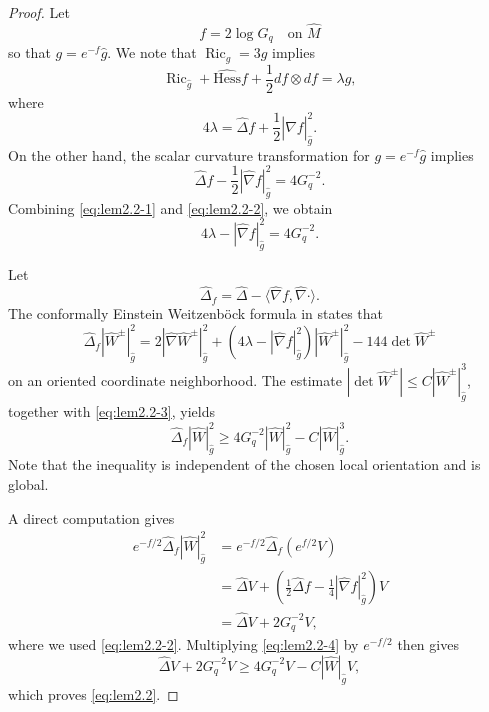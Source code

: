 \documentclass[11pt]{amsart}
\theoremstyle{plain}
\numberwithin{equation}{section}
\newcommand{\wh}[1]{\widehat{#1}}
\newcommand{\hess}{\mathrm{Hess}}
\DeclareMathOperator{\ric}{Ric}
\newcommand{\hd}{\widehat{\Delta}}
\newcommand{\hn}{\widehat{\nabla}}
\newcommand{\hg}{\widehat{g}}
\newcommand{\hw}{\widehat{W}}
\newcommand{\hm}{\widehat{M}}
\begin{document}
\begin{proof}
Let
\begin{equation*}
f=2\log G_q\quad\text{on $\hm$}
\end{equation*}
so that $g=e^{-f}\hg$. We note that $\ric_g=3g$ implies
\begin{equation*}
\ric_{\hg}+\wh{\hess}f+\frac{1}{2}df\otimes df=\lambda\hg,
\end{equation*}
where
\begin{equation}\label{eq:lem2.2-1}
4\lambda=\hd f+\frac{1}{2}|\hn f|_{\hg}^2.
\end{equation}
On the other hand, the scalar curvature transformation for $g=e^{-f}\hg$ implies 
\begin{equation}\label{eq:lem2.2-2}
\hd f-\frac{1}{2}|\hn f|_{\hg}^2=4G_q^{-2}.
\end{equation}
Combining \eqref{eq:lem2.2-1} and \eqref{eq:lem2.2-2}, we obtain
\begin{equation}\label{eq:lem2.2-3}
4\lambda-|\hn f|_{\hg}^2=4G_q^{-2}.
\end{equation}

Let 
\begin{equation*}
\hd_f=\hd-\langle\hn f,\hn\cdot\rangle.
\end{equation*}
The conformally Einstein Weitzenb\"ock formula in \cite[Corollary 1.1]{Wu2017} states that
\begin{equation*}
\hd_f|\hw^{\pm}|^2_{\hg}=2|\hn\hw^{\pm}|^2_{\hg}+\left(4\lambda-|\hn f|^2_{\hg}\right)|\hw^{\pm}|^2_{\hg}-144\det \hw^{\pm}
\end{equation*}
on an oriented coordinate neighborhood. The estimate $|\det\hw^{\pm}|\le C|\hw^{\pm}|^3_{\hg}$, together with \eqref{eq:lem2.2-3}, yields 
\begin{equation}\label{eq:lem2.2-4}
\hd_f|\hw|^2_{\hg}\ge 4G_q^{-2}|\hw|^2_{\hg}-C|\hw|^3_{\hg}.
\end{equation}
Note that the inequality is independent of the chosen local orientation and is global.

A direct computation gives
\begin{align*}
e^{-f/2}\hd_f|\hw|^2_{\hg}&=e^{-f/2}\hd_f(e^{f/2}V)\\&=\hd V+\left(\frac{1}{2}\hd f-\frac{1}{4}|\hn f|^2_{\hg}\right)V\\&=\hd V+2G_q^{-2}V,
\end{align*}
where we used \eqref{eq:lem2.2-2}. Multiplying \eqref{eq:lem2.2-4} by $e^{-f/2}$ then gives
\begin{equation*}
\hd V+2G_q^{-2}V\ge 4G_q^{-2}V-C|\hw|_{\hg}V,
\end{equation*}
which proves \eqref{eq:lem2.2}.
\end{proof}
\end{document}
